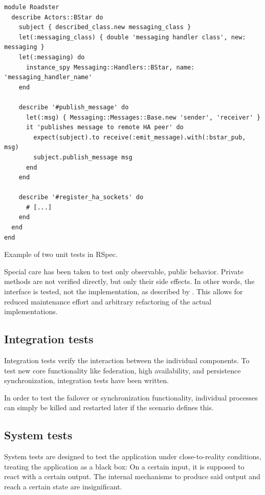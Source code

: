 
\begin{listing}
	\begin{verbatim}
module Roadster
  describe Actors::BStar do
    subject { described_class.new messaging_class }
    let(:messaging_class) { double 'messaging handler class', new: messaging }
    let(:messaging) do
      instance_spy Messaging::Handlers::BStar, name: 'messaging_handler_name'
    end

    describe '#publish_message' do
      let(:msg) { Messaging::Messages::Base.new 'sender', 'receiver' }
      it 'publishes message to remote HA peer' do
        expect(subject).to receive(:emit_message).with(:bstar_pub, msg)
        subject.publish_message msg
      end
    end

    describe '#register_ha_sockets' do
      # [...]
    end
  end
end
	\end{verbatim}
	\caption{Example of two unit tests in RSpec.}
	\label{lst:testing:unit}
\end{listing}


Special care has been taken to test only observable, public behavior.
Private methods are not verified directly, but only their side effects. In
other words, the interface is tested, not the implementation, as described by
\cite{rb:testing:magic-tricks}. This allows for reduced maintenance effort and
arbitrary refactoring of the actual implementations.




\subsection{Integration tests}
Integration tests verify the interaction between the individual components.
To test new core functionality like federation, high availability, and persistence
synchronization, integration tests have been written.

In order to test the failover or synchronization functionality, individual processes
can simply be killed and restarted later if the scenario defines this.


\subsection{System tests}
System tests are designed to test the application under close-to-reality
conditions, treating the application as a black box: On a certain input, it is
supposed to react with a certain output. The internal mechanisms to produce said
output and reach a certain state are insignificant.

